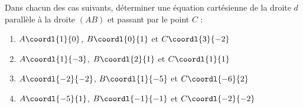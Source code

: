 \begin{exo}{}
	Dans chacun des cas suivants, déterminer une équation cartésienne de la droite $d$ parallèle à la droite $(AB)$ et passant par le point $C$ :
	\begin{enumerate}
		\item $A\coordl{1}{0}$, $B\coordl{0}{1}$ et $C\coordl{3}{-2}$
		\item $A\coordl{1}{-3}$, $B\coordl{2}{1}$ et $C\coordl{1}{1}$
		\item $A\coordl{-2}{-2}$, $B\coordl{1}{-5}$ et $C\coordl{-6}{2}$
		\item $A\coordl{-5}{1}$, $B\coordl{-1}{-1}$ et $C\coordl{-2}{-2}$
	\end{enumerate}
\end{exo}
